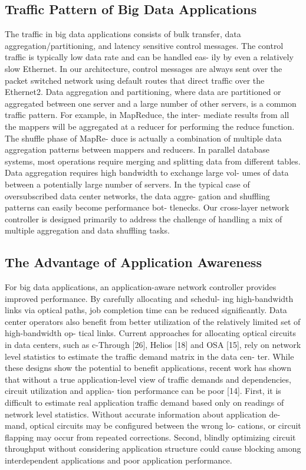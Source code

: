 \documentclass[runningheads,a4paper]{llncs}
\begin{document}
\subsection{Traffic Pattern of Big Data Applications}

The traffic in big data applications consists of bulk transfer, data aggregation/partitioning, and latency sensitive control messages. The control traffic is typically low data rate and can be handled eas- ily by even a relatively slow Ethernet. In our architecture, control messages are always sent over the packet switched network using default routes that direct traffic over the Ethernet2.
Data aggregation and partitioning, where data are partitioned or aggregated between one server and a large number of other servers, is a common traffic pattern. For example, in MapReduce, the inter- mediate results from all the mappers will be aggregated at a reducer for performing the reduce function. The shuffle phase of MapRe- duce is actually a combination of multiple data aggregation patterns between mappers and reducers. In parallel database systems, most operations require merging and splitting data from different tables. Data aggregation requires high bandwidth to exchange large vol- umes of data between a potentially large number of servers. In the typical case of oversubscribed data center networks, the data aggre- gation and shuffling patterns can easily become performance bot- tlenecks. Our cross-layer network controller is designed primarily to address the challenge of handling a mix of multiple aggregation and data shuffling tasks.

\subsection{The Advantage of Application Awareness}
For big data applications, an application-aware network controller provides improved performance. By carefully allocating and schedul- ing high-bandwidth links via optical paths, job completion time can be reduced significantly. Data center operators also benefit from better utilization of the relatively limited set of high-bandwidth op- tical links.
Current approaches for allocating optical circuits in data centers, such as c-Through [26], Helios [18] and OSA [15], rely on network level statistics to estimate the traffic demand matrix in the data cen- ter. While these designs show the potential to benefit applications, recent work has shown that without a true application-level view of traffic demands and dependencies, circuit utilization and applica- tion performance can be poor [14]. First, it is difficult to estimate real application traffic demand based only on readings of network level statistics. Without accurate information about application de- mand, optical circuits may be configured between the wrong lo- cations, or circuit flapping may occur from repeated corrections. Second, blindly optimizing circuit throughput without considering application structure could cause blocking among interdependent applications and poor application performance.
\end{document}
